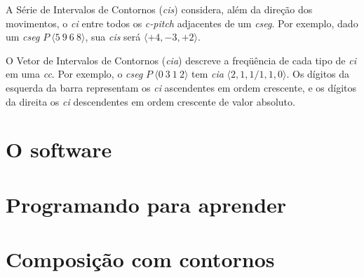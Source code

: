 \documentclass[brazil]{article}
\newcommand{\termo}[1]{\textit{#1}}
\begin{document}
A Série de Intervalos de Contornos (\termo{cis}) considera, além da
direção dos movimentos, o \termo{ci} entre todos os \termo{c-pitch}
adjacentes de um \termo{cseg}. Por exemplo, dado um \termo{cseg}
$P\:\langle5\:9\:6\:8\rangle$, sua \termo{cis} será
$\langle+4,-3,+2\rangle$.

O Vetor de Intervalos de Contornos (\termo{cia}) descreve a freqüência
de cada tipo de \termo{ci} em uma \termo{cc}. Por exemplo, o
\termo{cseg} $P\:\langle0\:3\:1\:2\rangle$ tem \termo{cia}
$\langle2,1,1/1,1,0\rangle$. Os dígitos da esquerda da barra
representam os \termo{ci} ascendentes em ordem crescente, e os dígitos
da direita os \termo{ci} descendentes em ordem crescente de valor
absoluto.

\section{O software}
\label{sec:o-software}

\section{Programando para aprender}
\label{sec:progr-para-aprend}

\section{Composição com contornos}
\label{sec:comp-com-cont}

\renewcommand{\refname}{Referências Bibliográficas}


\end{document}
